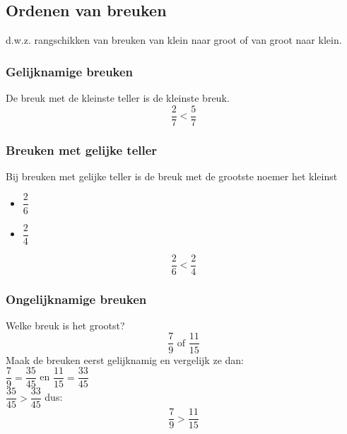 \documentclass[12pt]{article}
\begin{document}
\subsection{Ordenen van breuken}

d.w.z. rangschikken van breuken van klein naar groot of van groot naar klein.

\subsubsection{Gelijknamige breuken}

De breuk met de kleinste teller is de kleinste breuk.
$$\dfrac{2}{7} < \dfrac{5}{7}$$

\subsubsection{Breuken met gelijke teller}

Bij breuken met gelijke teller is de breuk met de grootste noemer het kleinst

\begin{itemize}
  \item $\dfrac{2}{6}$\hspace*{1em}
  \item $\dfrac{2}{4}$\hspace*{1em}
\end{itemize}

$$\dfrac{2}{6} < \dfrac{2}{4}$$

\subsubsection{Ongelijknamige breuken}

\begin{voorbeeld}
Welke breuk is het grootst?
$$\dfrac{7}{9} \mbox{ of } \dfrac{11}{15}$$
Maak de breuken eerst gelijknamig en vergelijk ze dan:\\
$\dfrac{7}{9}=\dfrac{35}{45}$ en $\dfrac{11}{15}=\dfrac{33}{45}$\\
$\dfrac{35}{45}>\dfrac{33}{45}$ dus:
$$\dfrac{7}{9}>\dfrac{11}{15}$$
\end{voorbeeld}
\end{document}

